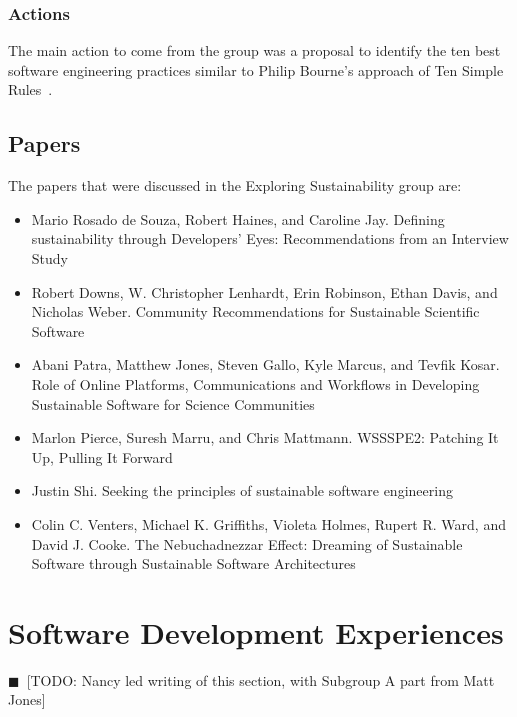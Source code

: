 \documentclass[11pt, oneside]{amsart}
\newcommand{\todo}[1]{{\color{blue}$\blacksquare$~\textsf{[TODO: #1]}}}
\begin{document}
\subsubsection{Actions}

The main action to come from the group was a proposal to identify the ten best
software engineering practices similar to Philip Bourne's approach of Ten Simple
Rules~\cite{bourne-ten-simple-rules}.

\subsection{Papers}
The papers that were discussed in the Exploring Sustainability group are:
\begin{itemize}
\item Mario Rosado de Souza, Robert Haines, and Caroline Jay. Defining
sustainability through Developers' Eyes: Recommendations from an Interview
Study~\cite{wssspe2_rosada_de_souza}

\item Robert Downs, W. Christopher Lenhardt, Erin Robinson, Ethan Davis, and
Nicholas Weber. Community Recommendations for Sustainable Scientific
Software~\cite{wssspe2_downs}

\item Abani Patra, Matthew Jones, Steven Gallo, Kyle Marcus, and Tevfik Kosar.
Role of Online Platforms, Communications and Workflows in Developing Sustainable
Software for Science Communities~\cite{wssspe2_patra}

\item Marlon Pierce, Suresh Marru, and Chris Mattmann. {WSSSPE2}: Patching It Up,
Pulling It Forward~\cite{wssspe2_pierce}

\item Justin Shi. Seeking the principles of sustainable software
engineering~\cite{wssspe2_shi}

\item Colin C. Venters, Michael K. Griffiths, Violeta Holmes, Rupert R. Ward, and
David J. Cooke. The Nebuchadnezzar Effect: Dreaming of Sustainable Software
through Sustainable Software Architectures~\cite{wssspe2_venters}
\end{itemize}

\section{Software Development Experiences} \label{sec:devel}
\todo{Nancy led writing of this section, with Subgroup A part from Matt Jones}
\end{document}
